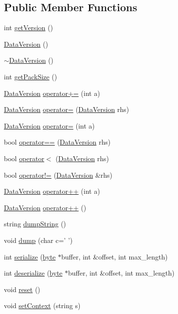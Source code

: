 \subsection*{Public Member Functions}
\begin{DoxyCompactItemize}
\item 
int \hyperlink{struct_data_version_a7d857b2f8fc3f8cee37955f40940daf7}{getVersion} ()
\item 
\hyperlink{struct_data_version_a8d3b825f579e947bf68f63649d246942}{DataVersion} ()
\item 
\hyperlink{struct_data_version_a2e6f550927276f1dd15a0c1631fce5c6}{$\sim$DataVersion} ()
\item 
int \hyperlink{struct_data_version_a77899e6e8255693a00a56250c2d26572}{getPackSize} ()
\item 
\hyperlink{struct_data_version}{DataVersion} \hyperlink{struct_data_version_a0079199056aad2cd9489a54942d0e602}{operator+=} (int a)
\item 
\hyperlink{struct_data_version}{DataVersion} \hyperlink{struct_data_version_a7d3401d93321da06993fc47f2a802009}{operator=} (\hyperlink{struct_data_version}{DataVersion} rhs)
\item 
\hyperlink{struct_data_version}{DataVersion} \hyperlink{struct_data_version_aae15f8e09ffada6e3ab052de902928ce}{operator=} (int a)
\item 
bool \hyperlink{struct_data_version_ab42c883acee09bcbf1d487da8a79cae8}{operator==} (\hyperlink{struct_data_version}{DataVersion} rhs)
\item 
bool \hyperlink{struct_data_version_a18e35a067946065ace0c4c2de7846d46}{operator$<$} (\hyperlink{struct_data_version}{DataVersion} rhs)
\item 
bool \hyperlink{struct_data_version_afcf7bba215d28dfd7dec5018aeb5057a}{operator!=} (\hyperlink{struct_data_version}{DataVersion} \&rhs)
\item 
\hyperlink{struct_data_version}{DataVersion} \hyperlink{struct_data_version_a3d5a1c141bbfbb2035f2fb4ec74b8ba7}{operator++} (int a)
\item 
\hyperlink{struct_data_version}{DataVersion} \hyperlink{struct_data_version_ac90719117093b35fe7ad1cf98bcfc630}{operator++} ()
\item 
string \hyperlink{struct_data_version_a09ef74f4b532a991d2a05982d012d524}{dumpString} ()
\item 
void \hyperlink{struct_data_version_a03b5b85b2c309989eb96c2248b0dedfa}{dump} (char c=' ')
\item 
int \hyperlink{struct_data_version_aad05f62a3e2cd0da4120b970c27f3451}{serialize} (\hyperlink{engine_8hpp_a0c8186d9b9b7880309c27230bbb5e69d}{byte} $\ast$buffer, int \&offset, int max\_\-length)
\item 
int \hyperlink{struct_data_version_ac5bce97d68ce11492781071558bb1191}{deserialize} (\hyperlink{engine_8hpp_a0c8186d9b9b7880309c27230bbb5e69d}{byte} $\ast$buffer, int \&offset, int max\_\-length)
\item 
void \hyperlink{struct_data_version_a78dfae7089aaeffd22198af366968bb3}{reset} ()
\item 
void \hyperlink{struct_data_version_a987f2c352ed0c65a7e9d83a1cabebb66}{setContext} (string s)
\end{DoxyCompactItemize}
